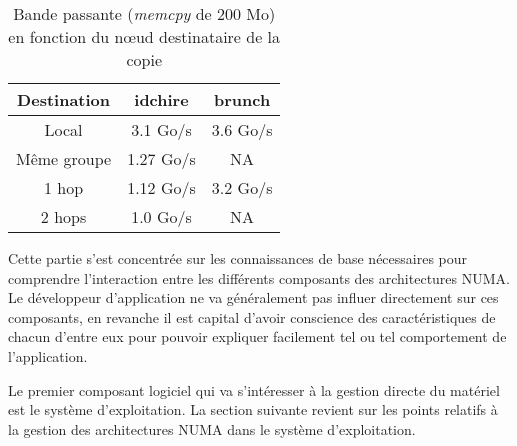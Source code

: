 \begin{table}[ht]
\def\arraystretch{1.5}
\centering
\begin{tabular}{|c||c|c|}\hline
  Destination & idchire & brunch  \\ \hline
 Local & 3.1 Go/s & 3.6 Go/s \\ \hline
 Même groupe & 1.27 Go/s & NA \\ \hline
 1 hop & 1.12 Go/s & 3.2 Go/s \\ \hline
 2 hops & 1.0 Go/s & NA \\ \hline
\end{tabular}
\caption{Bande passante (\emph{memcpy} de 200 Mo) en fonction du nœud destinataire de la copie}\label{tab:topologie-hops}
\end{table}

\bigskip

Cette partie s'est concentrée sur les connaissances de base nécessaires pour comprendre l'interaction entre les différents composants des architectures NUMA.
Le développeur d'application ne va généralement pas influer directement sur ces composants, en revanche il est capital d'avoir conscience des caractéristiques de chacun d'entre eux pour pouvoir expliquer facilement tel ou tel comportement de l'application.

Le premier composant logiciel qui va s'intéresser à la gestion directe du matériel est le système d'exploitation.
La section suivante revient sur les points relatifs à la gestion des architectures NUMA dans le système d'exploitation.
